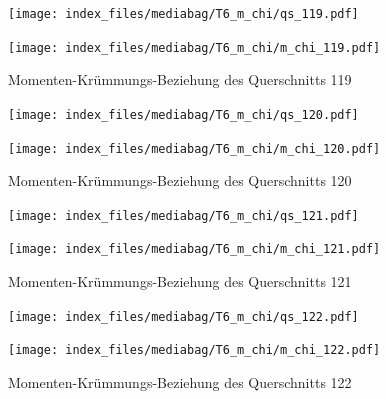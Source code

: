 \documentclass[
  11pt,
  letterpaper,
]{scrreprt}
\begin{document}
\begin{figure}[H]

\begin{minipage}{0.50\linewidth}
\texttt{[image: index\_files/mediabag/T6\_m\_chi/qs\_119.pdf]}\end{minipage}%
%
\begin{minipage}{0.50\linewidth}
\texttt{[image: index\_files/mediabag/T6\_m\_chi/m\_chi\_119.pdf]}\end{minipage}%

\caption{\label{fig-mchi_anhang}Momenten-Krümmungs-Beziehung des
Querschnitts 119}

\end{figure}%

\begin{figure}[H]

\begin{minipage}{0.50\linewidth}
\texttt{[image: index\_files/mediabag/T6\_m\_chi/qs\_120.pdf]}\end{minipage}%
%
\begin{minipage}{0.50\linewidth}
\texttt{[image: index\_files/mediabag/T6\_m\_chi/m\_chi\_120.pdf]}\end{minipage}%

\caption{\label{fig-mchi_anhang}Momenten-Krümmungs-Beziehung des
Querschnitts 120}

\end{figure}%

\begin{figure}[H]

\begin{minipage}{0.50\linewidth}
\texttt{[image: index\_files/mediabag/T6\_m\_chi/qs\_121.pdf]}\end{minipage}%
%
\begin{minipage}{0.50\linewidth}
\texttt{[image: index\_files/mediabag/T6\_m\_chi/m\_chi\_121.pdf]}\end{minipage}%

\caption{\label{fig-mchi_anhang}Momenten-Krümmungs-Beziehung des
Querschnitts 121}

\end{figure}%

\begin{figure}[H]

\begin{minipage}{0.50\linewidth}
\texttt{[image: index\_files/mediabag/T6\_m\_chi/qs\_122.pdf]}\end{minipage}%
%
\begin{minipage}{0.50\linewidth}
\texttt{[image: index\_files/mediabag/T6\_m\_chi/m\_chi\_122.pdf]}\end{minipage}%

\caption{\label{fig-mchi_anhang}Momenten-Krümmungs-Beziehung des
Querschnitts 122}

\end{figure}%
\end{document}
